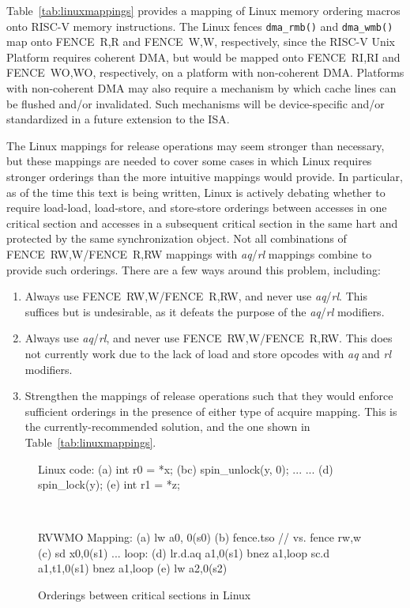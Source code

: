 Table~\ref{tab:linuxmappings} provides a mapping of Linux memory ordering macros onto RISC-V memory instructions.
The Linux fences {\tt dma\_rmb()} and {\tt dma\_wmb()} map onto FENCE~R,R and FENCE~W,W, respectively, since the RISC-V Unix Platform requires coherent DMA, but would be mapped onto FENCE~RI,RI and FENCE~WO,WO, respectively, on a platform with non-coherent DMA.
Platforms with non-coherent DMA may also require a mechanism by which cache lines can be flushed and/or invalidated.
Such mechanisms will be device-specific and/or standardized in a future extension to the ISA.

The Linux mappings for release operations may seem stronger than necessary, but these mappings are needed to cover some cases in which Linux requires stronger orderings than the more intuitive mappings would provide.
In particular, as of the time this text is being written, Linux is actively debating whether to require load-load, load-store, and store-store orderings between accesses in one critical section and accesses in a subsequent critical section in the same hart and protected by the same synchronization object.
Not all combinations of FENCE~RW,W/FENCE~R,RW mappings with {\em aq}/{\em rl} mappings combine to provide such orderings.
There are a few ways around this problem, including:
\begin{enumerate}
  \item Always use FENCE~RW,W/FENCE~R,RW, and never use {\em aq}/{\em rl}.  This suffices but is undesirable, as it defeats the purpose of the {\em aq}/{\em rl} modifiers.
  \item Always use {\em aq}/{\em rl}, and never use FENCE~RW,W/FENCE~R,RW.  This does not currently work due to the lack of load and store opcodes with {\em aq} and {\em rl} modifiers.
  \item Strengthen the mappings of release operations such that they would enforce sufficient orderings in the presence of either type of acquire mapping.  This is the currently-recommended solution, and the one shown in Table~\ref{tab:linuxmappings}.
\end{enumerate}

\begin{figure}[h!]
  \centering\small
  \begin{verbbox}
Linux code:
(a)  int r0 = *x;
(bc) spin_unlock(y, 0);
     ...
     ...
(d)  spin_lock(y);
(e)  int r1 = *z;
  \end{verbbox}
  \theverbbox
  ~~~~~~~~~~
  \begin{verbbox}
RVWMO Mapping:
(a) lw           a0, 0(s0)
(b) fence.tso  // vs. fence rw,w
(c) sd           x0,0(s1)
    ...
    loop:
(d) lr.d.aq a1,0(s1)
    bnez         a1,loop
    sc.d a1,t1,0(s1)
    bnez         a1,loop
(e) lw           a2,0(s2)
  \end{verbbox}
  \theverbbox
  \caption{Orderings between critical sections in Linux}
  \label{fig:litmus:lkmm_ll}
\end{figure}

